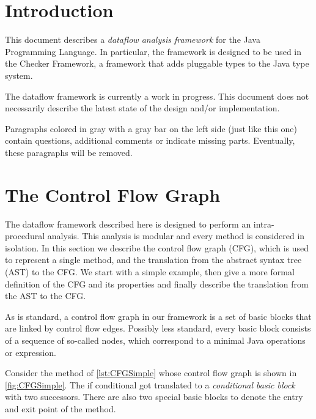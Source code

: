 
\section{Introduction}

This document describes a \emph{dataflow analysis framework} for the Java Programming Language.
In particular, the framework is designed to be used in the Checker Framework, a framework
that adds pluggable types to the Java type system.

\begin{workinprogress}
    The dataflow framework is currently a work in progress. This document does not necessarily describe
    the latest state of the design and/or implementation.
    
    Paragraphs colored in gray with a gray bar on the left side (just like this one)
    contain questions, additional comments or indicate missing parts. Eventually, these
    paragraphs will be removed.
\end{workinprogress}





\section{The Control Flow Graph}
\label{sec:cfg}


The dataflow framework described here is designed to perform an intra-procedural analysis.
This analysis is modular and every method is considered in isolation. In this section
we describe the control flow graph (CFG), which is used to represent a single method, and the
translation from the abstract syntax tree (AST) to the CFG. We start with a simple
example, then give a more formal definition of the CFG and its properties and finally
describe the translation from the AST to the CFG.

As is standard, a control flow graph in our framework is a set of basic blocks
that are linked by control flow edges. Possibly less standard,
every basic block consists of a sequence
of so-called nodes, which correspond to a minimal Java operations or expression.



Consider the method  of \autoref{lst:CFGSimple} whose control
flow graph is shown in \autoref{fig:CFGSimple}. The if conditional got translated to
a \emph{conditional basic block} with two successors. There are also two
special basic blocks to denote the entry and exit point of the method.


